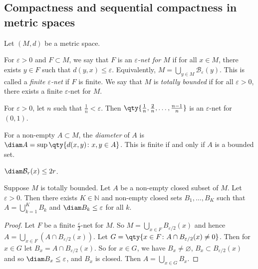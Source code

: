 \subsection{Compactness and sequential compactness in metric spaces}
Let \( (M, d) \) be a metric space.
\begin{definition}
	For \( \varepsilon > 0 \) and \( F \subset M \), we say that \( F \) is an \textit{\( \varepsilon \)-net for \( M \)} if for all \( x \in M \), there exists \( y \in F \) such that \( d(y,x) \leq \varepsilon \).
	Equivalently, \( M = \bigcup_{y \in M} \mathcal B_\varepsilon(y) \).
	This is called a \textit{finite \( \varepsilon \)-net} if \( F \) is finite.
	We say that \( M \) is \textit{totally bounded} if for all \( \varepsilon > 0 \), there exists a finite \( \varepsilon \)-net for \( M \).
\end{definition}
\begin{example}
	For \( \varepsilon > 0 \), let \( n \) such that \( \frac{1}{n} < \varepsilon \).
	Then \( \qty{\frac{1}{n}, \frac{2}{n}, \dots, \frac{n-1}{n}} \) is an \( \varepsilon \)-net for \( (0,1) \).
\end{example}
\begin{definition}
	For a non-empty \( A \subset M \), the \textit{diameter} of \( A \) is \( \diam A = \sup\qty{d(x,y) \colon x,y \in A} \).
	This is finite if and only if \( A \) is a bounded set.
\end{definition}
\begin{example}
	\( \diam \mathcal B_r(x) \leq 2r \).
\end{example}
\begin{lemma}
	Suppose \( M \) is totally bounded.
	Let \( A \) be a non-empty closed subset of \( M \).
	Let \( \varepsilon > 0 \).
	Then there exists \( K \in \mathbb N \) and non-empty closed sets \( B_1, \dots, B_K \) such that \( A = \bigcup_{k=1}^K B_k \) and \( \diam B_k \leq \varepsilon \) for all \( k \).
\end{lemma}
\begin{proof}
	Let \( F \) be a finite \( \frac{\varepsilon}{2} \)-net for \( M \).
	So \( M = \bigcup_{x \in F} B_{\varepsilon/2}(x) \) and hence \( A = \bigcup_{x \in F} (A \cap B_{\varepsilon/2}(x)) \).
	Let \( G = \qty{ x \in F \colon A \cap B_{\varepsilon / 2}(x) \neq 0 } \).
	Then for \( x \in G \) let \( B_x = A \cap B_{\varepsilon / 2}(x) \).
	So for \( x \in G \), we have \( B_x \neq \varnothing \), \( B_x \subset B_{\varepsilon/2}(x) \) and so \( \diam B_x \leq \varepsilon \), and \( B_x \) is closed.
	Then \( A = \bigcup_{x \in G} B_x \).
\end{proof}
